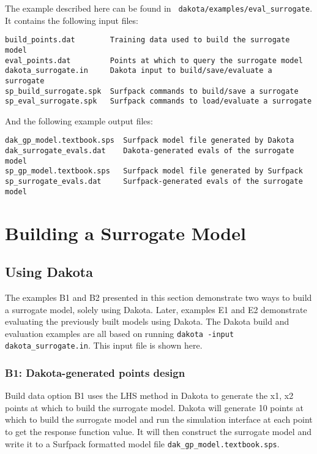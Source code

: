 \documentclass{article}
\begin{document}
The example described here can be found in {\tt
  dakota/examples/eval\_surrogate}.  It contains the following input
files:\\
\begin{bigbox}
\begin{verbatim}
build_points.dat        Training data used to build the surrogate model
eval_points.dat         Points at which to query the surrogate model
dakota_surrogate.in     Dakota input to build/save/evaluate a surrogate 
sp_build_surrogate.spk  Surfpack commands to build/save a surrogate
sp_eval_surrogate.spk   Surfpack commands to load/evaluate a surrogate
\end{verbatim}
\end{bigbox}
And the following example output files:\\
\begin{bigbox}
\begin{verbatim}
dak_gp_model.textbook.sps  Surfpack model file generated by Dakota
dak_surrogate_evals.dat    Dakota-generated evals of the surrogate model
sp_gp_model.textbook.sps   Surfpack model file generated by Surfpack
sp_surrogate_evals.dat     Surfpack-generated evals of the surrogate model
\end{verbatim}
\end{bigbox}

\section{Building a Surrogate Model}

\subsection{Using Dakota}

The examples B1 and B2 presented in this section demonstrate two ways
to build a surrogate model, solely using Dakota.  Later, examples E1
and E2 demonstrate evaluating the previously built models using
Dakota.  The Dakota build and evaluation examples are all based on
running {\tt dakota -input dakota\_surrogate.in}.  This input file is
shown here.

\hrulefill

\hrulefill

\subsubsection*{B1: Dakota-generated points design}

Build data option B1 uses the LHS method in Dakota to generate the x1,
x2 points at which to build the surrogate model.  Dakota will generate
10 points at which to build the surrogate model and run the simulation
interface at each point to get the response function value.  It will
then construct the surrogate model and write it to a Surfpack
formatted model file {\tt dak\_gp\_model.textbook.sps}.
\end{document}
